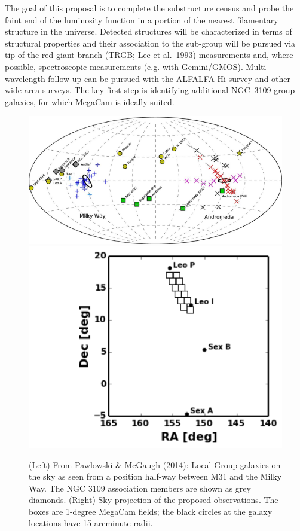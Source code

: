 The goal of this proposal is to complete the substructure census and probe the faint end of the luminosity function in 
a portion of the nearest filamentary structure in the universe. Detected structures will be characterized in terms of 
structural properties and their association to the sub-group will be pursued via tip-of-the-red-giant-branch 
(TRGB; Lee et al.\ 1993) measurements and, where possible, spectroscopic measurements (e.g. with Gemini/GMOS). 
Multi-wavelength follow-up can be pursued with the ALFALFA H{\sc i} survey and other wide-area surveys.
The key first step is identifying additional NGC~3109 group galaxies, for which MegaCam is
ideally suited.


\begin{figure}
\includegraphics[scale=0.9]{pm14_fig2}
\includegraphics[scale=0.6]{fields_leoi_new}
\caption{(Left)  From Pawlowski \& McGaugh (2014): Local Group galaxies on the sky as seen from a position half-way between M31 and the Milky Way.
The NGC 3109 association members are shown as grey diamonds.
(Right) Sky projection of the proposed observations. The boxes are 1-degree MegaCam fields; the black circles at the galaxy
locations have 15-arcminute radii. 
}
\end{figure}



